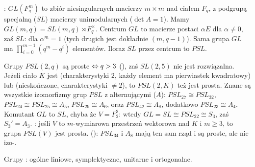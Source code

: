 :  $GL(F_q^m)$ to zbiór niesingularnych macierzy $m \times m$ nad ciałem $F_q$, z podgrupą specjalną ($SL$) macierzy unimodularnych ($\det A = 1$).
Mamy $GL(m, q) = SL(m, q) \rtimes F_q^\times$.
Centrum $GL$ to macierze postaci $\alpha E$ dla $\alpha \neq 0$, zaś $SL$: dla $\alpha^m = 1$ (tych drugich jest dokładnie $(m, q-1)$).
Sama grupa $GL$ ma $\prod_{i=0}^{m-1} (q^m - q^i)$ elementów.
Iloraz $SL$ przez centrum to  $PSL$.

Grupy $PSL(2, q)$ są  proste $\Leftrightarrow q > 3$ (), zaś $SL(2, 5)$ nie jest rozwiązalna.
Jeżeli ciało $K$ jest (charakterystyki $2$, każdy element ma pierwiastek kwadratowy) lub (nieskończone, charakterystyki $\neq 2$), to $PSL(2,K)$ też jest prosta.
Znane są wszystkie izomorfizmy grup $PSL$ z alternującymi ($A$):
$PSL_27 \cong PSL_32$, 
$PSL_24 \cong PSL_25 \cong A_5$,
$PSL_29 \cong A_6$,
oraz $PSL_42\cong A_8$, dodatkowo $PSL_23 \cong A_4$.
Komutant $GL$ to $SL$, chyba że $V = F_2^2$: wtedy $GL = SL \cong PSL_22 \cong S_3$, zaś $S_3' = A_3$.
: jeśli $V$ to $m$-wymiarowa przestrzeń wektorowa nad $K$ i $m \ge 3$, to grupa $PSL(V)$ jest prosta.
 (): $PSL_34$ i $A_8$ mają ten sam rząd i są proste, ale nie izo-.

Grupy : ogólne  liniowe, symplektyczne, unitarne i ortogonalne.